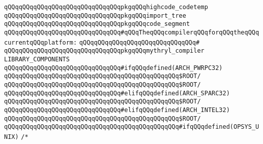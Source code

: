 \verb|qQQqqQQqqQQqqQQqqQQqqQQqqQQqqQQqpkgqQQqhighcode_codetemp|\newline
\verb|qQQqqQQqqQQqqQQqqQQqqQQqqQQqqQQqpkgqQQqimport_tree|\newline
\verb|qQQqqQQqqQQqqQQqqQQqqQQqqQQqqQQqpkgqQQqcode_segment|\newline
\newline
\verb|qQQqqQQqqQQqqQQqqQQqqQQqqQQqqQQq#qQQqTheqQQqcompilerqQQqforqQQqtheqQQqcurrentqQQqplatform:|\newline
\verb|qQQqqQQqqQQqqQQqqQQqqQQqqQQqqQQq#|\newline
\verb|qQQqqQQqqQQqqQQqqQQqqQQqqQQqqQQqpkgqQQqmythryl_compiler|\newline
\newline
\newline
\verb|LIBRARY_COMPONENTS|\newline
\verb|qQQqqQQqqQQqqQQqqQQqqQQqqQQqqQQq#ifqQQqdefined(ARCH_PWRPC32)|\newline
\newline
\verb|qQQqqQQqqQQqqQQqqQQqqQQqqQQqqQQqqQQqqQQqqQQqqQQq$ROOT/|\newline
\verb|qQQqqQQqqQQqqQQqqQQqqQQqqQQqqQQqqQQqqQQqqQQqqQQq$ROOT/|\newline
\newline
\verb|qQQqqQQqqQQqqQQqqQQqqQQqqQQqqQQq#elifqQQqdefined(ARCH_SPARC32)|\newline
\newline
\verb|qQQqqQQqqQQqqQQqqQQqqQQqqQQqqQQqqQQqqQQqqQQqqQQq$ROOT/|\newline
\newline
\verb|qQQqqQQqqQQqqQQqqQQqqQQqqQQqqQQq#elifqQQqdefined(ARCH_INTEL32)|\newline
\newline
\verb|qQQqqQQqqQQqqQQqqQQqqQQqqQQqqQQqqQQqqQQqqQQqqQQq$ROOT/|\newline
\newline
\verb|qQQqqQQqqQQqqQQqqQQqqQQqqQQqqQQqqQQqqQQqqQQqqQQq#ifqQQqdefined(OPSYS_UNIX)|\newline
\verb|/*|\newline
